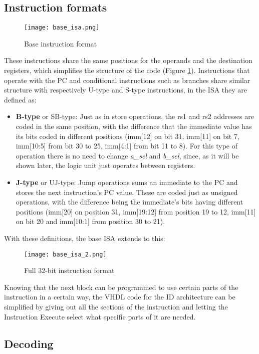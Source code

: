 \subsection{Instruction formats}
\begin{figure}[h!]
  \centering
  \texttt{[image: base\_isa.png]}
  \caption{Base instruction format \cite{waterman2016riscv}}
  \label{fig:base_form}
\end{figure}
These instructions share the same positions for the operands and the destination registers, which simplifies the structure of the code (Figure \ref{fig:base_form}).
Instructions that operate with the PC and conditional instructions such as branches share similar structure with respectively U-type and S-type instructions, in the ISA they are defined as:
\begin{itemize}
  \item \textbf{B-type} or SB-type: Just as in store operations, the rs1 and rs2 addresses are coded in the same position, with the difference that the immediate value has its bits coded in different positions (imm[12] on bit 31, imm[11] on bit 7, imm[10:5] from bit 30 to 25, imm[4:1] from bit 11 to 8). For this type of operation there is no need to change \emph{a\_sel} and \emph{b\_sel}, since, as it will be shown later, the logic unit just operates between registers.
  \item \textbf{J-type} or UJ-type: Jump operations sums an immediate to the PC and stores the next instruction's PC value. These are coded just as unsigned operations, with the difference being the immediate's bits having different positions (imm[20] on position 31, imm[19:12] from position 19 to 12, imm[11] on bit 20 and imm[10:1] from position 30 to 21).
\end{itemize}
With these definitions, the base ISA extends to this:
\begin{figure}[ht]
  \centering
  \texttt{[image: base\_isa\_2.png]}
  \caption{Full 32-bit instruction format \cite{waterman2016riscv}}
  \label{fig:full_form}
\end{figure}
Knowing that the next block can be programmed to use certain parts of the instruction in a certain way, the VHDL code for the ID architecture can be simplified by giving out all the sections of the instruction and letting the Instruction Execute select what specific parts of it are needed.

\subsection{Decoding}
